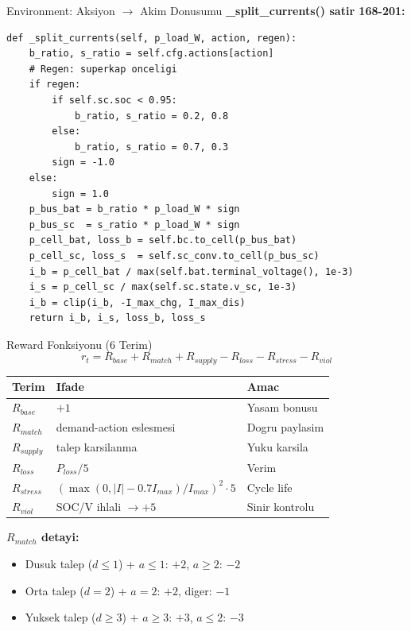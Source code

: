 \documentclass[10pt,aspectratio=169]{beamer}
\begin{document}
\begin{frame}[fragile]{Environment: Aksiyon $\to$ Akim Donusumu}
\textbf{\_split\_currents() satir 168-201:}
\begin{lstlisting}[style=py]
def _split_currents(self, p_load_W, action, regen):
    b_ratio, s_ratio = self.cfg.actions[action]
    # Regen: superkap onceligi
    if regen:
        if self.sc.soc < 0.95:
            b_ratio, s_ratio = 0.2, 0.8
        else:
            b_ratio, s_ratio = 0.7, 0.3
        sign = -1.0
    else:
        sign = 1.0
    p_bus_bat = b_ratio * p_load_W * sign
    p_bus_sc  = s_ratio * p_load_W * sign
    p_cell_bat, loss_b = self.bc.to_cell(p_bus_bat)
    p_cell_sc, loss_s  = self.sc_conv.to_cell(p_bus_sc)
    i_b = p_cell_bat / max(self.bat.terminal_voltage(), 1e-3)
    i_s = p_cell_sc / max(self.sc.state.v_sc, 1e-3)
    i_b = clip(i_b, -I_max_chg, I_max_dis)
    return i_b, i_s, loss_b, loss_s
\end{lstlisting}
\end{frame}

\begin{frame}{Reward Fonksiyonu (6 Terim)}
\[
r_t = R_{base} + R_{match} + R_{supply} - R_{loss} - R_{stress} - R_{viol}
\]

\begin{center}\footnotesize
\begin{tabular}{lll}
\toprule
Terim & Ifade & Amac \\
\midrule
$R_{base}$ & $+1$ & Yasam bonusu \\
$R_{match}$ & demand-action eslesmesi & Dogru paylasim \\
$R_{supply}$ & talep karsilanma & Yuku karsila \\
$R_{loss}$ & $P_{loss}/5$ & Verim \\
$R_{stress}$ & $(\max(0,|I|-0.7 I_{max})/I_{max})^2 \cdot 5$ & Cycle life \\
$R_{viol}$ & SOC/V ihlali $\to +5$ & Sinir kontrolu \\
\bottomrule
\end{tabular}
\end{center}

\vspace{0.4em}
\textbf{$R_{match}$ detayi:}
\begin{itemize}\footnotesize
  \item Dusuk talep ($d \leq 1$) + $a \leq 1$: $+2$, $a \geq 2$: $-2$
  \item Orta talep ($d = 2$) + $a = 2$: $+2$, diger: $-1$
  \item Yuksek talep ($d \geq 3$) + $a \geq 3$: $+3$, $a \leq 2$: $-3$
\end{itemize}
\end{frame}
\end{document}
